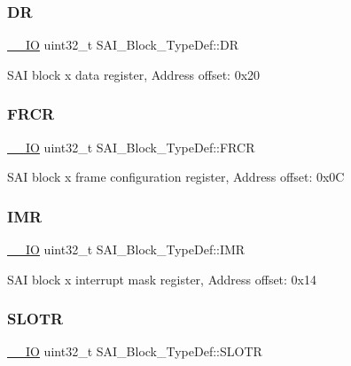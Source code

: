 \subsubsection{\texorpdfstring{DR}{DR}}
{\footnotesize\ttfamily \mbox{\hyperlink{core__sc300_8h_aec43007d9998a0a0e01faede4133d6be}{\+\_\+\+\_\+\+IO}} uint32\+\_\+t S\+A\+I\+\_\+\+Block\+\_\+\+Type\+Def\+::\+DR}

S\+AI block x data register, Address offset\+: 0x20 \mbox{\label{struct_s_a_i___block___type_def_a56001d4b130f392c99dde9a06379af96}} 
\subsubsection{\texorpdfstring{FRCR}{FRCR}}
{\footnotesize\ttfamily \mbox{\hyperlink{core__sc300_8h_aec43007d9998a0a0e01faede4133d6be}{\+\_\+\+\_\+\+IO}} uint32\+\_\+t S\+A\+I\+\_\+\+Block\+\_\+\+Type\+Def\+::\+F\+R\+CR}

S\+AI block x frame configuration register, Address offset\+: 0x0C \mbox{\label{struct_s_a_i___block___type_def_aefcc864961c2bb0465e2ced3bd8b4a14}} 
\subsubsection{\texorpdfstring{IMR}{IMR}}
{\footnotesize\ttfamily \mbox{\hyperlink{core__sc300_8h_aec43007d9998a0a0e01faede4133d6be}{\+\_\+\+\_\+\+IO}} uint32\+\_\+t S\+A\+I\+\_\+\+Block\+\_\+\+Type\+Def\+::\+I\+MR}

S\+AI block x interrupt mask register, Address offset\+: 0x14 \mbox{\label{struct_s_a_i___block___type_def_aaef957d89b76c3fa2c09ff61ee0db11d}} 
\subsubsection{\texorpdfstring{SLOTR}{SLOTR}}
{\footnotesize\ttfamily \mbox{\hyperlink{core__sc300_8h_aec43007d9998a0a0e01faede4133d6be}{\+\_\+\+\_\+\+IO}} uint32\+\_\+t S\+A\+I\+\_\+\+Block\+\_\+\+Type\+Def\+::\+S\+L\+O\+TR}

